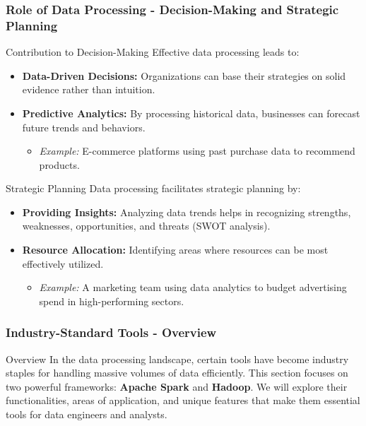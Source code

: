 \documentclass[aspectratio=169]{beamer}
\begin{document}
\begin{frame}[fragile]
    \frametitle{Role of Data Processing - Decision-Making and Strategic Planning}
    \begin{block}{Contribution to Decision-Making}
        Effective data processing leads to:
        \begin{itemize}
            \item \textbf{Data-Driven Decisions:} Organizations can base their strategies on solid evidence rather than intuition.
            \item \textbf{Predictive Analytics:} By processing historical data, businesses can forecast future trends and behaviors.
                \begin{itemize}
                    \item \textit{Example:} E-commerce platforms using past purchase data to recommend products.
                \end{itemize}
        \end{itemize}
    \end{block}
    
    \begin{block}{Strategic Planning}
        Data processing facilitates strategic planning by:
        \begin{itemize}
            \item \textbf{Providing Insights:} Analyzing data trends helps in recognizing strengths, weaknesses, opportunities, and threats (SWOT analysis).
            \item \textbf{Resource Allocation:} Identifying areas where resources can be most effectively utilized.
                \begin{itemize}
                    \item \textit{Example:} A marketing team using data analytics to budget advertising spend in high-performing sectors.
                \end{itemize}
        \end{itemize}
    \end{block}
\end{frame}

\begin{frame}[fragile]
    \frametitle{Industry-Standard Tools - Overview}
    \begin{block}{Overview}
        In the data processing landscape, certain tools have become industry staples for handling massive volumes of data efficiently. This section focuses on two powerful frameworks: \textbf{Apache Spark} and \textbf{Hadoop}. We will explore their functionalities, areas of application, and unique features that make them essential tools for data engineers and analysts.
    \end{block}
\end{frame}
\end{document}
